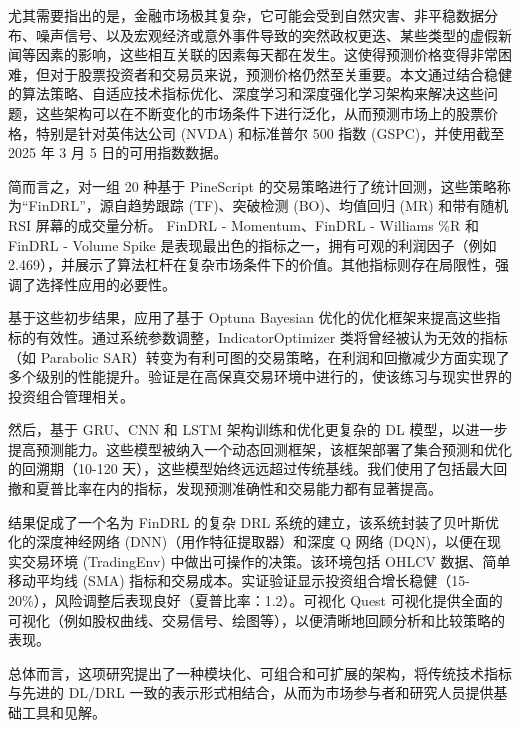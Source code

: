 尤其需要指出的是，金融市场极其复杂，它可能会受到自然灾害、非平稳数据分布、噪声信号、以及宏观经济或意外事件导致的突然政权更迭、某些类型的虚假新闻等因素的影响，这些相互关联的因素每天都在发生。这使得预测价格变得非常困难，但对于股票投资者和交易员来说，预测价格仍然至关重要。本文通过结合稳健的算法策略、自适应技术指标优化、深度学习和深度强化学习架构来解决这些问题，这些架构可以在不断变化的市场条件下进行泛化，从而预测市场上的股票价格，特别是针对英伟达公司 (NVDA) 和标准普尔 500 指数 (GSPC)，并使用截至 2025 年 3 月 5 日的可用指数数据。

简而言之，对一组 20 种基于 PineScript 的交易策略进行了统计回测，这些策略称为“FinDRL”，源自趋势跟踪 (TF)、突破检测 (BO)、均值回归 (MR) 和带有随机 RSI 屏幕的成交量分析。 FinDRL - Momentum、FinDRL - Williams \%R 和 FinDRL - Volume Spike 是表现最出色的指标之一，拥有可观的利润因子（例如 2.469），并展示了算法杠杆在复杂市场条件下的价值。其他指标则存在局限性，强调了选择性应用的必要性。

基于这些初步结果，应用了基于 Optuna Bayesian 优化的优化框架来提高这些指标的有效性。通过系统参数调整，IndicatorOptimizer 类将曾经被认为无效的指标（如 Parabolic SAR）转变为有利可图的交易策略，在利润和回撤减少方面实现了多个级别的性能提升。验证是在高保真交易环境中进行的，使该练习与现实世界的投资组合管理相关。

然后，基于 GRU、CNN 和 LSTM 架构训练和优化更复杂的 DL 模型，以进一步提高预测能力。这些模型被纳入一个动态回测框架，该框架部署了集合预测和优化的回溯期（10-120 天），这些模型始终远远超过传统基线。我们使用了包括最大回撤和夏普比率在内的指标，发现预测准确性和交易能力都有显著提高。

结果促成了一个名为 FinDRL 的复杂 DRL 系统的建立，该系统封装了贝叶斯优化的深度神经网络 (DNN)（用作特征提取器）和深度 Q 网络 (DQN)，以便在现实交易环境 (TradingEnv) 中做出可操作的决策。该环境包括 OHLCV 数据、简单移动平均线 (SMA) 指标和交易成本。实证验证显示投资组合增长稳健（15-20\%），风险调整后表现良好（夏普比率：1.2）。可视化 Quest 可视化提供全面的可视化（例如股权曲线、交易信号、绘图等），以便清晰地回顾分析和比较策略的表现。

总体而言，这项研究提出了一种模块化、可组合和可扩展的架构，将传统技术指标与先进的 DL/DRL 一致的表示形式相结合，从而为市场参与者和研究人员提供基础工具和见解。